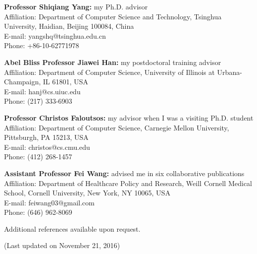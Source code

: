 \documentclass[margin, 10pt]{res}
\begin{document}
\begin{resume}
\textbf{Professor Shiqiang Yang:} my Ph.D. advisor \\
{Affiliation}: {Department of Computer Science and Technology, Tsinghua University, Haidian, Beijing 100084, China} \\
{E-mail:} {yangshq@tsinghua.edu.cn} \\
{Phone:} {+86-10-62771978}

\textbf{Abel Bliss Professor Jiawei Han:} my postdoctoral training advisor \\
{Affiliation}: {Department of Computer Science, University of Illinois at Urbana-Champaign, IL 61801, USA} \\
{E-mail:} {hanj@cs.uiuc.edu} \\
{Phone:} {(217) 333-6903}

\textbf{Professor Christos Faloutsos:} my advisor when I was a visiting Ph.D. student \\
{Affiliation}: {Department of Computer Science, Carnegie Mellon University, Pittsburgh, PA 15213, USA} \\
{E-mail:} {christos@cs.cmu.edu} \\
{Phone:} {(412) 268-1457}

\textbf{Assistant Professor Fei Wang:} advised me in six collaborative publications \\
{Affiliation}: {Department of Healthcare Policy and Research, Weill Cornell Medical School, Cornell University, New York, NY 10065, USA} \\
{E-mail:} {feiwang03@gmail.com} \\
{Phone:} {(646) 962-8069}

Additional references available upon request.

(Last updated on November 21, 2016)
\end{resume}
\end{document}
